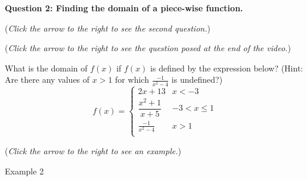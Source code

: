 \documentclass{ximera}
\begin{document}
\textbf{Question 2: Finding the domain of a piece-wise function.}
\begin{question}
\begin{flushright}
{\color{blue}(\emph{Click the arrow to the right to see the second question.})}
\end{flushright}
\begin{center}
\begin{expandable}
\begin{flushright}
{\color{blue}(\emph{Click the arrow to the right to see the  question
posed at the end of the video.})}
\end{flushright}
\begin{expandable}
What is the domain of $f(x)$ if $f(x)$ is defined by the expression below?  (Hint: Are there any values of $x>1$ for which $\frac{-1}{x^2-4}$ is undefined?)\\

\[ f(x) = \begin{cases} 
      2x+13 & x<-3 \\
      \dfrac{x^2+1}{x+5} & -3< x\leq 1 \\
      \frac{-1}{x^2-4} & x> 1\\	
   \end{cases} \]

\begin{multipleChoice}
\choice{$(-\infty, -3]$}
\choice{$(-3, 1]$}
\choice{$[-3,-1]$}
\choice{$[1, \infty)$}
\choice{$(-\infty, -3) \cup (-3, 1]$}
\choice{$(-3, 1] \cup (1, \infty)$}
\choice{$(-\infty, -3) \cup (-3, 1] \cup [1, \infty)$}
\choice{$(-\infty, -3) \cup (-3, -2) \cup (-2, 1] \cup (1, 2) \cup (2, \infty)$}
\choice[correct]{$(-\infty, -3) \cup (-3, 1] \cup (1, 2) \cup (2, \infty)$}
\end{multipleChoice}

\begin{flushright}
{\color{blue}(\emph{Click the arrow to the right to see an example.})}
\end{flushright}
\begin{expandable}
\begin{center}
Example 2
\end{center}
\end{expandable}
\end{expandable}
\end{expandable}
\end{center}
\end{question}
\end{document}
